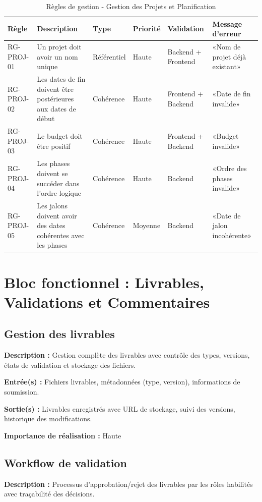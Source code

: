 \begin{table}[H]
\centering
\footnotesize
\begin{tabular}{|p{1.5cm}|p{3.5cm}|p{1.5cm}|p{1.5cm}|p{2cm}|p{2.5cm}|}
\hline
\textbf{Règle} & \textbf{Description} & \textbf{Type} & \textbf{Priorité} & \textbf{Validation} & \textbf{Message d'erreur} \\
\hline
RG-PROJ-01 & Un projet doit avoir un nom unique & Référentiel & Haute & Backend + Frontend & «Nom de projet déjà existant» \\
\hline
RG-PROJ-02 & Les dates de fin doivent être postérieures aux dates de début & Cohérence & Haute & Frontend + Backend & «Date de fin invalide» \\
\hline
RG-PROJ-03 & Le budget doit être positif & Cohérence & Haute & Frontend + Backend & «Budget invalide» \\
\hline
RG-PROJ-04 & Les phases doivent se succéder dans l'ordre logique & Cohérence & Haute & Backend & «Ordre des phases invalide» \\
\hline
RG-PROJ-05 & Les jalons doivent avoir des dates cohérentes avec les phases & Cohérence & Moyenne & Backend & «Date de jalon incohérente» \\
\hline
\end{tabular}
\caption{Règles de gestion - Gestion des Projets et Planification}
\label{tab:rg_projets}
\end{table}

\section{Bloc fonctionnel : Livrables, Validations et Commentaires}

\subsection{Gestion des livrables}
\textbf{Description :} Gestion complète des livrables avec contrôle des types, versions, états de validation et stockage des fichiers.

\textbf{Entrée(s) :} Fichiers livrables, métadonnées (type, version), informations de soumission.

\textbf{Sortie(s) :} Livrables enregistrés avec URL de stockage, suivi des versions, historique des modifications.

\textbf{Importance de réalisation :} Haute

\subsection{Workflow de validation}
\textbf{Description :} Processus d'approbation/rejet des livrables par les rôles habilités avec traçabilité des décisions.


